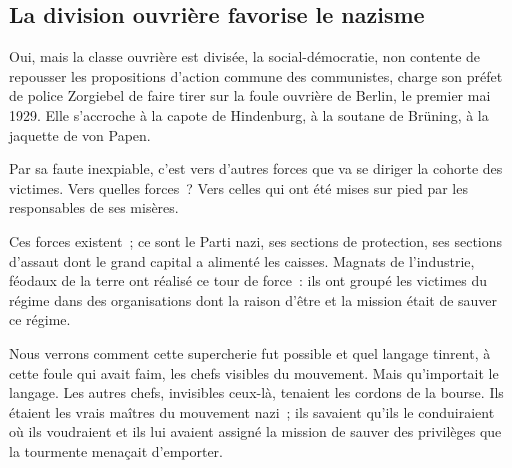 \documentclass[french,twoside]{book} %
\begin{document}
\subsection[La division ouvrière favorise le nazisme]{La division ouvrière favorise le nazisme}
\noindent Oui, mais la classe ouvrière est divisée, la social-démocratie, non contente de repousser les propositions d’action commune des communistes, charge son préfet de police Zorgiebel de faire tirer sur la foule ouvrière de Berlin, le premier mai 1929. Elle s’accroche à la capote de Hindenburg, à la soutane de Brüning, à la jaquette de von Papen.\par
Par sa faute inexpiable, c’est vers d’autres forces que va se diriger la cohorte des victimes. Vers quelles forces ? Vers celles qui ont été mises sur pied par les responsables de ses misères.\par
Ces forces existent ; ce sont le Parti nazi, ses sections de protection, ses sections d’assaut dont le grand capital a alimenté les caisses. Magnats de l’industrie, féodaux de la terre ont réalisé ce tour de force : ils ont groupé les victimes du régime dans des organisations dont la raison d’être et la mission était de sauver ce régime.\par
Nous verrons comment cette supercherie fut possible et quel langage tinrent, à cette foule qui avait faim, les chefs visibles du mouvement. Mais qu’importait le langage. Les autres chefs, invisibles ceux-là, tenaient les cordons de la bourse. Ils étaient les vrais maîtres du mouvement nazi ; ils savaient qu’ils le conduiraient où ils voudraient et ils lui avaient assigné la mission de sauver des privilèges que la tourmente menaçait d’emporter.
\end{document}

